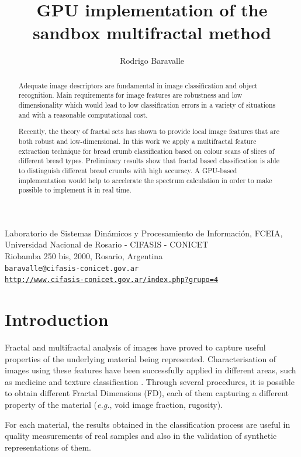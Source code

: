 \documentclass[oneside,a4paper,english,links]{article}
\title{GPU implementation of the sandbox multifractal method}
\author{Rodrigo Baravalle}
\begin{document}
\maketitle
\begin{center}
\small{Laboratorio de Sistemas Din\'amicos y Procesamiento de Informaci\'on, FCEIA, Universidad Nacional de Rosario - CIFASIS - CONICET}\\
\small{Riobamba 250 bis, 2000, Rosario, Argentina}\\

\texttt{baravalle@cifasis-conicet.gov.ar}\\
\texttt{\url{http://www.cifasis-conicet.gov.ar/index.php?grupo=4}}
\end{center}

\begin{abstract}
Adequate image descriptors are fundamental in image classification and object recognition. Main requirements for image features are robustness and low dimensionality which would lead to low classification errors in a variety of situations and with a reasonable computational cost. 

Recently, the theory of fractal sets has shown to provide local image features that are both robust and low-dimensional. In this work we apply a multifractal feature extraction technique for bread crumb classification based on colour scans of slices of different bread types. Preliminary results show that fractal based classification is able to distinguish different bread crumbs with high accuracy. A GPU-based implementation would help to accelerate the spectrum calculation in order to make possible to implement it in real time.
\end{abstract}

\section{Introduction}
Fractal and multifractal analysis of images have proved to capture useful properties of the underlying material being represented. Characterisation of images using these features have been successfully applied in different areas, such as medicine \cite{Andjelkovic2008,Yu2011} and texture classification \cite{Wendt2009}. Through several procedures, it is possible to obtain different Fractal Dimensions (FD), each of them capturing a different property of the material ({\em e.g.}, void image fraction, rugosity).

For each material, the results obtained in the classification process are useful in quality measurements of real samples and also in the validation of synthetic representations of them. 
\end{document}
